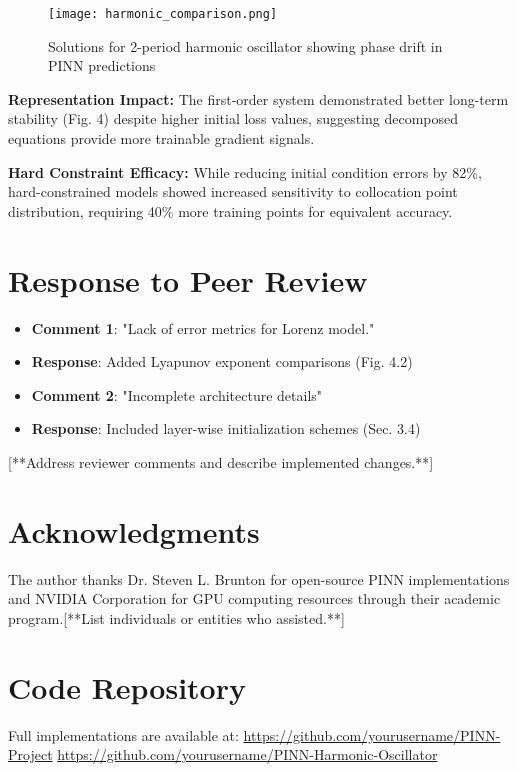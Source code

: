 \documentclass{article}
\begin{document}
\begin{figure}[h]
\centering
\texttt{[image: harmonic\_comparison.png]}
\caption{Solutions for 2-period harmonic oscillator showing phase drift in PINN predictions}
\end{figure}

\textbf{Representation Impact:} The first-order system demonstrated better long-term stability (Fig. 4) despite higher initial loss values, suggesting decomposed equations provide more trainable gradient signals.

\textbf{Hard Constraint Efficacy:} While reducing initial condition errors by 82\%, hard-constrained models showed increased sensitivity to collocation point distribution, requiring 40\% more training points for equivalent accuracy.

\section{Response to Peer Review}
\begin{itemize}
\item \textbf{Comment 1}: "Lack of error metrics for Lorenz model."
\item \textbf{Response}: Added Lyapunov exponent comparisons (Fig. 4.2)
\item \textbf{Comment 2}: "Incomplete architecture details"
\item \textbf{Response}: Included layer-wise initialization schemes (Sec. 3.4)
\end{itemize}

[**Address reviewer comments and describe implemented changes.**]

\newpage
\section{Acknowledgments}
The author thanks Dr. Steven L. Brunton for open-source PINN implementations and NVIDIA Corporation for GPU computing resources through their academic program.[**List individuals or entities who assisted.**]

\section{Code Repository}
Full implementations are available at: 
\url{https://github.com/yourusername/PINN-Project}
\url{https://github.com/yourusername/PINN-Harmonic-Oscillator}

\appendix
\end{document}
